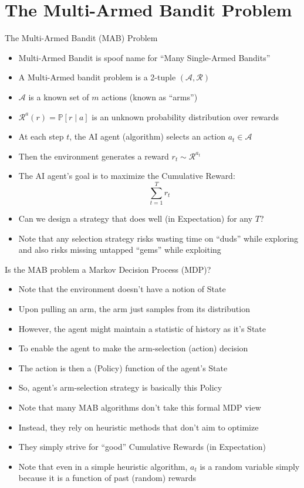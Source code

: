 \section{The Multi-Armed Bandit Problem}
\begin{frame}{The Multi-Armed Bandit (MAB) Problem}
\begin{itemize}
    \item Multi-Armed Bandit is spoof name for ``Many Single-Armed
          Bandits''
    \item A Multi-Armed bandit problem is a 2-tuple $(\mathcal{A}, \mathcal{R})$
    \item $\mathcal{A}$ is a known set of $m$ actions (known as ``arms'')
    \item $\mathcal{R}^a(r) = \mathbb{P}[r \mid a]$ is an unknown probability distribution over rewards
    \item At each step $t$, the AI agent (algorithm) selects an action $a_t \in \mathcal{A}$
    \item Then the environment generates a reward $r_t \sim \mathcal{R}^{a_t}$
    \item The AI agent's goal is to maximize the Cumulative Reward:
    \[
        \sum_{t=1}^{T} r_t
    \]
    \item Can we design a strategy that does well (in Expectation) for any $T$?
    \item Note that any selection strategy risks wasting time on ``duds'' while
          exploring and also risks missing untapped ``gems'' while exploiting
\end{itemize}
\end{frame}

\begin{frame}{Is the MAB problem a Markov Decision Process (MDP)?}
\begin{itemize}
    \item Note that the environment doesn't have a notion of State
    \item Upon pulling an arm, the arm just samples from its distribution
    \item However, the agent might maintain a statistic of history as it's State
    \item To enable the agent to make the arm-selection (action) decision
    \item The action is then a (Policy) function of the agent's State
    \item So, agent's arm-selection strategy is basically this Policy
    \item Note that many MAB algorithms don't take this formal MDP view
    \item Instead, they rely on heuristic methods that don't aim to optimize
    \item They simply strive for ``good'' Cumulative Rewards (in Expectation)
    \item Note that even in a simple heuristic algorithm, $a_t$ is a random
          variable simply because it is a function of past (random) rewards
\end{itemize}
\end{frame}
